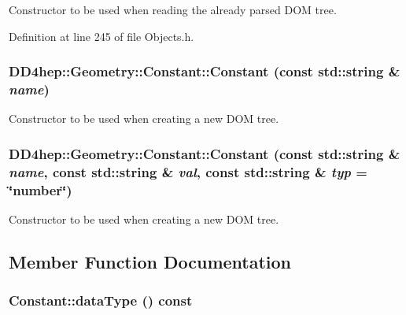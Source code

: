 Constructor to be used when reading the already parsed DOM tree. 

Definition at line 245 of file Objects.h.\hypertarget{class_d_d4hep_1_1_geometry_1_1_constant_afad7246c4626ec178f1d6a16739e7836}{
\subsubsection[{Constant}]{\setlength{\rightskip}{0pt plus 5cm}DD4hep::Geometry::Constant::Constant (const std::string \& {\em name})}}
\label{class_d_d4hep_1_1_geometry_1_1_constant_afad7246c4626ec178f1d6a16739e7836}


Constructor to be used when creating a new DOM tree. \hypertarget{class_d_d4hep_1_1_geometry_1_1_constant_a0f3d423fc380aa32ef1ea3b635ec4629}{
\subsubsection[{Constant}]{\setlength{\rightskip}{0pt plus 5cm}DD4hep::Geometry::Constant::Constant (const std::string \& {\em name}, \/  const std::string \& {\em val}, \/  const std::string \& {\em typ} = {\ttfamily \char`\"{}number\char`\"{}})}}
\label{class_d_d4hep_1_1_geometry_1_1_constant_a0f3d423fc380aa32ef1ea3b635ec4629}


Constructor to be used when creating a new DOM tree. 

\subsection{Member Function Documentation}
\hypertarget{class_d_d4hep_1_1_geometry_1_1_constant_a1cb86176f3a45cc92f2b75025e840ae5}{
\subsubsection[{dataType}]{ Constant::dataType () const}}
\label{class_d_d4hep_1_1_geometry_1_1_constant_a1cb86176f3a45cc92f2b75025e840ae5}


